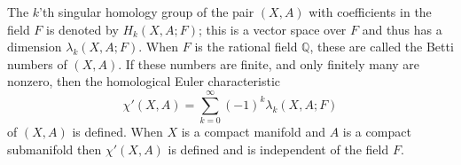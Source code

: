 The $k$'th singular homology group of the pair $(X,A)$ with coefficients in the field $F$ is denoted by $H_k(X,A;F)$; this is a vector space over $F$ and thus has a dimension $\lambda_k(X,A;F)$. When $F$ is the rational field $\mathbb{Q}$, these are called the Betti numbers of $(X,A)$. If these numbers are finite, and only finitely many are nonzero, then the homological Euler characteristic
$$\chi'(X,A) = \sum_{k=0}^{\infty} (-1)^k \lambda_k(X,A;F)$$
of $(X,A)$ is defined. When $X$ is a compact manifold and $A$ is a compact submanifold then $\chi'(X,A)$ is defined and is independent of the field $F$.
